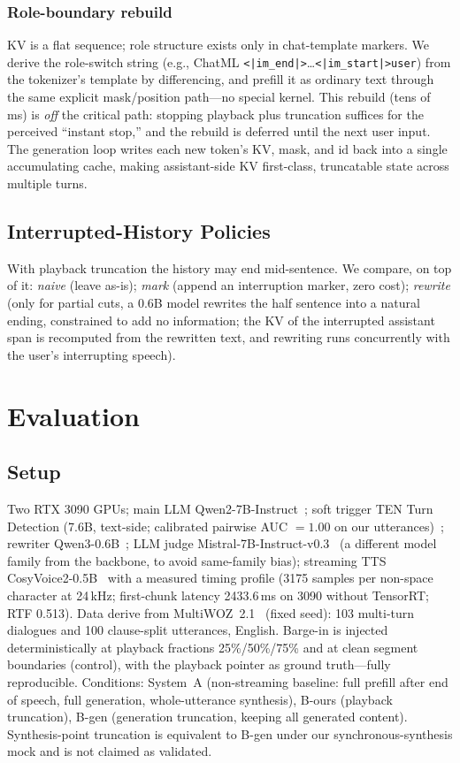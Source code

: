 \documentclass[conference]{IEEEtran}
\begin{document}
\subsubsection{Role-boundary rebuild} KV is a flat sequence; role structure exists only in chat-template markers. We derive the role-switch string (e.g., ChatML \texttt{<|im\_end|>}\ldots\texttt{<|im\_start|>user}) from the tokenizer's template by differencing, and prefill it as ordinary text through the same explicit mask/position path---no special kernel. This rebuild (tens of ms) is \emph{off} the critical path: stopping playback plus truncation suffices for the perceived ``instant stop,'' and the rebuild is deferred until the next user input. The generation loop writes each new token's KV, mask, and id back into a single accumulating cache, making assistant-side KV first-class, truncatable state across multiple turns.

\subsection{Interrupted-History Policies}\label{sec:hist}
With playback truncation the history may end mid-sentence. We compare, on top of it: \emph{naive} (leave as-is); \emph{mark} (append an interruption marker, zero cost); \emph{rewrite} (only for partial cuts, a 0.6B model rewrites the half sentence into a natural ending, constrained to add no information; the KV of the interrupted assistant span is recomputed from the rewritten text, and rewriting runs concurrently with the user's interrupting speech).

\section{Evaluation}\label{sec:eval}
\subsection{Setup}
Two RTX 3090 GPUs; main LLM Qwen2-7B-Instruct~\cite{qwen2}; soft trigger TEN Turn Detection (7.6B, text-side; calibrated pairwise AUC $=1.00$ on our utterances)~\cite{ten_turn}; rewriter Qwen3-0.6B~\cite{qwen3}; LLM judge Mistral-7B-Instruct-v0.3~\cite{mistral7b} (a different model family from the backbone, to avoid same-family bias); streaming TTS CosyVoice2-0.5B~\cite{cosyvoice2} with a measured timing profile (3175 samples per non-space character at 24\,kHz; first-chunk latency 2433.6\,ms on 3090 without TensorRT; RTF 0.513). Data derive from MultiWOZ~2.1~\cite{multiwoz21} (fixed seed): 103 multi-turn dialogues and 100 clause-split utterances, English. Barge-in is injected deterministically at playback fractions 25\%/50\%/75\% and at clean segment boundaries (control), with the playback pointer as ground truth---fully reproducible. Conditions: System~A (non-streaming baseline: full prefill after end of speech, full generation, whole-utterance synthesis), B-ours (playback truncation), B-gen (generation truncation, keeping all generated content). Synthesis-point truncation is equivalent to B-gen under our synchronous-synthesis mock and is not claimed as validated.
\end{document}

